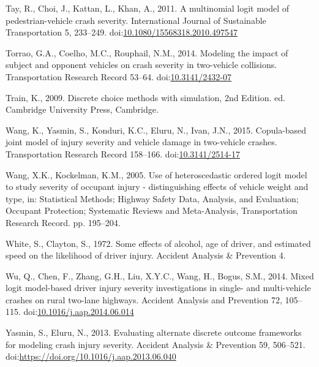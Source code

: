 \documentclass[]{elsarticle} %
\begin{document}
\leavevmode\hypertarget{ref-Tay2011multinomial}{}%
Tay, R., Choi, J., Kattan, L., Khan, A., 2011. A multinomial logit model
of pedestrian-vehicle crash severity. International Journal of
Sustainable Transportation 5, 233--249.
doi:\href{https://doi.org/10.1080/15568318.2010.497547}{10.1080/15568318.2010.497547}

\leavevmode\hypertarget{ref-Torrao2014modeling}{}%
Torrao, G.A., Coelho, M.C., Rouphail, N.M., 2014. Modeling the impact of
subject and opponent vehicles on crash severity in two-vehicle
collisions. Transportation Research Record 53--64.
doi:\href{https://doi.org/10.3141/2432-07}{10.3141/2432-07}

\leavevmode\hypertarget{ref-Train2009discrete}{}%
Train, K., 2009. Discrete choice methods with simulation, 2nd Edition.
ed. Cambridge University Press, Cambridge.

\leavevmode\hypertarget{ref-Wang2015copula}{}%
Wang, K., Yasmin, S., Konduri, K.C., Eluru, N., Ivan, J.N., 2015.
Copula-based joint model of injury severity and vehicle damage in
two-vehicle crashes. Transportation Research Record 158--166.
doi:\href{https://doi.org/10.3141/2514-17}{10.3141/2514-17}

\leavevmode\hypertarget{ref-Wang2005use}{}%
Wang, X.K., Kockelman, K.M., 2005. Use of heteroscedastic ordered logit
model to study severity of occupant injury - distinguishing effects of
vehicle weight and type, in: Statistical Methods; Highway Safety Data,
Analysis, and Evaluation; Occupant Protection; Systematic Reviews and
Meta-Analysis, Transportation Research Record. pp. 195--204.

\leavevmode\hypertarget{ref-White1972effects}{}%
White, S., Clayton, S., 1972. Some effects of alcohol, age of driver,
and estimated speed on the likelihood of driver injury. Accident
Analysis \& Prevention 4.

\leavevmode\hypertarget{ref-Wu2014mixed}{}%
Wu, Q., Chen, F., Zhang, G.H., Liu, X.Y.C., Wang, H., Bogus, S.M., 2014.
Mixed logit model-based driver injury severity investigations in single-
and multi-vehicle crashes on rural two-lane highways. Accident Analysis
and Prevention 72, 105--115.
doi:\href{https://doi.org/10.1016/j.aap.2014.06.014}{10.1016/j.aap.2014.06.014}

\leavevmode\hypertarget{ref-Yasmin2013evaluating}{}%
Yasmin, S., Eluru, N., 2013. Evaluating alternate discrete outcome
frameworks for modeling crash injury severity. Accident Analysis \&
Prevention 59, 506--521.
doi:\href{https://doi.org/https://doi.org/10.1016/j.aap.2013.06.040}{https://doi.org/10.1016/j.aap.2013.06.040}
\end{document}

